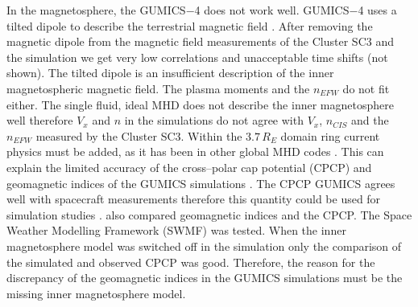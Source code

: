 \documentclass[linenumbers,draft]{agujournal}
\begin{document}
In the magnetosphere, the GUMICS$-$4 does not work well. GUMICS$-$4 uses a tilted dipole to describe the terrestrial magnetic field \citep{janhunen12:_gumic_mhd}. After removing the magnetic dipole from the magnetic field measurements of the Cluster SC3 and the simulation we get very low correlations and unacceptable time shifts (not shown). The tilted dipole is an insufficient description of the inner magnetospheric magnetic field. The plasma moments and the $n_{EFW}$ do not fit either. The single fluid, ideal MHD does not describe the inner magnetosphere well therefore $V_{x}$ and $n$ in the simulations do not agree with $V_{x}$, $n_{CIS}$ and the $n_{EFW}$ measured by the Cluster SC3. Within the $3.7\,R_{E}$ domain ring current physics must be added, as it has been in other global MHD codes \citep[for example][]{toth12:_adapt}. This can explain the limited accuracy of the cross--polar cap potential (CPCP) and geomagnetic indices of the GUMICS simulations \citep{juusola14:_statis_gumic_mhd}. The CPCP GUMICS agrees well with spacecraft measurements therefore this quantity could be used for simulation studies \citep{lakka18:_cross_polar_cap_satur_gumic}. \citet{haiducek17:_swmf_global_magnet_simul_januar} also compared geomagnetic indices and the CPCP. The Space Weather Modelling Framework (SWMF) was tested. When the inner magnetosphere model was switched off in the simulation only the comparison of the simulated and observed CPCP was good. Therefore, the reason for the discrepancy of the geomagnetic indices in the GUMICS simulations must be the missing inner magnetosphere model.
\end{document}
